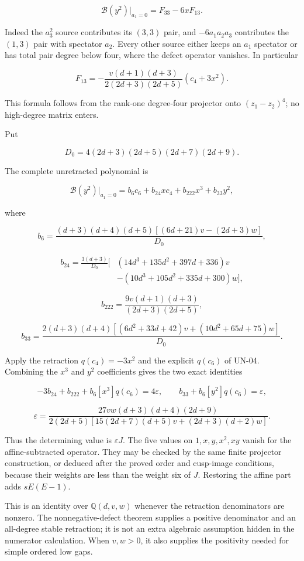 \documentclass[a4paper,11pt]{article}
\numberwithin{equation}{section}
\begin{document}
\[
\mathscr B(y^2)\big|_{a_1=0}
=F_{33}-6xF_{13}.
\]

Indeed the \(a_3^2\) source contributes its \((3,3)\) pair, and \(-6a_1a_2a_3\) contributes the \((1,3)\) pair with spectator \(a_2\). Every other source either keeps an \(a_1\) spectator or has total pair degree below four, where the defect operator vanishes. In particular

\[
F_{13}=
-\frac{v(d+1)(d+3)}{2(2d+3)(2d+5)}(c_4+3x^2).
\]

This formula follows from the rank-one degree-four projector onto \((z_1-z_2)^4\); no high-degree matrix enters.

Put

\[
D_0=4(2d+3)(2d+5)(2d+7)(2d+9).
\]

The complete unretracted polynomial is

\[
\mathscr B(y^2)\big|_{a_1=0}
=b_6c_6+b_{24}xc_4+b_{222}x^3+b_{33}y^2,
\]

where

\[
b_6=
\frac{(d+3)(d+4)(d+5)[(6d+21)v-(2d+3)w]}{D_0},
\]

\[
\begin{aligned}
b_{24}=\frac{3(d+3)}{D_0}\big[
&(14d^3+135d^2+397d+336)v\\
&-(10d^3+105d^2+335d+300)w\big],
\end{aligned}
\]

\[
b_{222}=\frac{9v(d+1)(d+3)}{(2d+3)(2d+5)},
\]

\[
b_{33}=
\frac{2(d+3)(d+4)[(6d^2+33d+42)v+(10d^2+65d+75)w]}{D_0}.
\]

Apply the retraction \(q(c_4)=-3x^2\) and the explicit \(q(c_6)\) of UN-04. Combining the \(x^3\) and \(y^2\) coefficients gives the two exact identities

\[
-3b_{24}+b_{222}+b_6[x^3]q(c_6)=4\varepsilon,
\qquad
b_{33}+b_6[y^2]q(c_6)=\varepsilon,
\]

\[
\varepsilon=
\frac{27vw(d+3)(d+4)(2d+9)}
{2(2d+5)[15(2d+7)(d+5)v+(2d+3)(d+2)w]}.
\]

Thus the determining value is \(\varepsilon J\). The five values on \(1,x,y,x^2,xy\) vanish for the affine-subtracted operator. They may be checked by the same finite projector construction, or deduced after the proved order and cusp-image conditions, because their weights are less than the weight six of \(J\). Restoring the affine part adds \(sE(E-1)\).

This is an identity over \(\mathbb Q(d,v,w)\) whenever the retraction denominators are nonzero. The nonnegative-defect theorem supplies a positive denominator and an all-degree stable retraction; it is not an extra algebraic assumption hidden in the numerator calculation. When \(v,w>0\), it also supplies the positivity needed for simple ordered low gaps.
\end{document}
